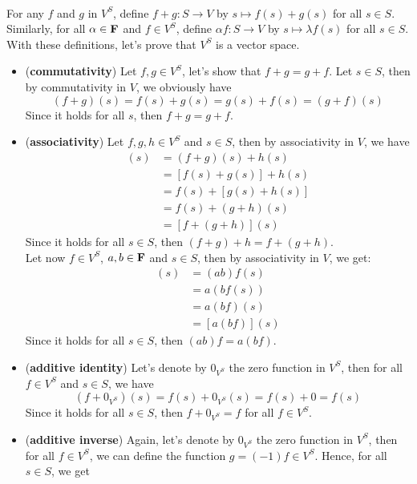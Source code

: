 \begin{solution}
    \\ For any $f$ and $g$ in $V^S$, define $f + g : S \to V$ by $s \mapsto f(s) + g(s)$ for all $s \in S$. Similarly, for all $\alpha \in \mathbf{F}$ and $f \in V^S$, define $\alpha f : S \to V$ by $s \mapsto \lambda f(s)$ for all $s \in S$. With these definitions, let's prove that $V^S$ is a vector space.
    \begin{itemize}
        \item (\textbf{commutativity}) Let $f, g \in V^S$, let's show that $f + g = g + f$. Let $s \in S$, then by commutativity in $V$, we obviously have
        $$(f+g)(s) = f(s) + g(s) = g(s) + f(s) = (g+f)(s)$$
        Since it holds for all $s$, then $f + g = g + f$.
        \item (\textbf{associativity}) Let $f,g,h \in V^S$ and $s \in S$, then by associativity in $V$, we have
        \begin{align*}
            [(f+g)+h](s) &= (f+g)(s) + h(s) \\
            &= [f(s) + g(s)] + h(s) \\
            &= f(s) + [g(s) + h(s)] \\
            &= f(s) + (g+h)(s) \\
            &= [f + (g+h)](s)
        \end{align*}
        Since it holds for all $s \in S$, then $(f+g) + h= f + (g+h)$. \\
        Let now $f \in V^S$, $a,b \in \mathbf{F}$ and $s \in S$, then by associativity in $V$, we get:
        \begin{align*}
            [(ab)f](s) &= (ab)f(s) \\
            &= a(bf(s)) \\
            &= a(bf)(s) \\
            &= [a(bf)](s)
        \end{align*}
        Since it holds for all $s \in S$, then $(ab)f = a(bf)$.
        \item (\textbf{additive identity}) Let's denote by $0_{V^S}$ the zero function in $V^S$, then for all $f \in V^S$ and $s \in S$, we have
        $$(f+0_{V^S})(s) = f(s) + 0_{V^S}(s) = f(s) + 0 = f(s)$$
        Since it holds for all $s \in S$, then $f + 0_{V^S} = f$ for all $f \in V^S$.
        \item (\textbf{additive inverse}) Again, let's denote by $0_{V^S}$ the zero function in $V^S$, then for all $f \in V^S$, we can define the function $g = (-1)f \in V^S$. Hence, for all $s \in S$, we get

\end{itemize}
\end{solution}
